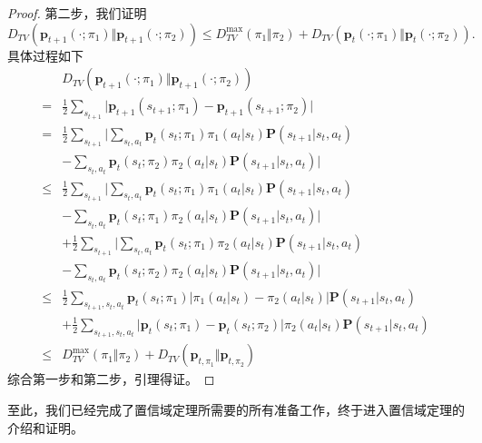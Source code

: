 \begin{proof}
    第二步，我们证明
    \begin{equation*}
        D_{TV}(\mathbf{p}_{t+1}(\cdot; \pi_1) \Vert \mathbf{p}_{t+1}(\cdot; \pi_2)) \le D^{\max}_{TV}(\pi_1 \Vert \pi_2) + D_{TV}(\mathbf{p}_{t}(\cdot; \pi_1) \Vert \mathbf{p}_{t}(\cdot; \pi_2)).
    \end{equation*}
    具体过程如下
    \begin{align*}
        &D_{TV}(\mathbf{p}_{t+1}(\cdot; \pi_1) \Vert \mathbf{p}_{t+1}(\cdot; \pi_2)) \\
        =& \frac{1}{2} \sum_{s_{t+1}} \vert \mathbf{p}_{t+1}(s_{t+1}; \pi_1) - \mathbf{p}_{t+1}(s_{t+1}; \pi_2) \vert \\
        =& \frac{1}{2} \sum_{s_{t+1}} 
        \bigg\vert \sum_{s_t, a_t} \mathbf{p}_t(s_t; \pi_1) \pi_1(a_t \vert s_t) \mathbf{P}(s_{t+1} \vert s_t, a_t) \\
        & - \sum_{s_t, a_t} \mathbf{p}_t(s_t; \pi_2) \pi_2(a_t \vert s_t) \mathbf{P}(s_{t+1} \vert s_t, a_t) \bigg\vert \\
        \le& \frac{1}{2} \sum_{s_{t+1}} 
        \bigg\vert \sum_{s_t, a_t} \mathbf{p}_t(s_t; \pi_1) \pi_1(a_t \vert s_t) \mathbf{P}(s_{t+1} \vert s_t, a_t) \\
        & - \sum_{s_t, a_t} \mathbf{p}_t(s_t; \pi_1) \pi_2(a_t \vert s_t) \mathbf{P}(s_{t+1} \vert s_t, a_t) \bigg\vert \\
        &+ \frac{1}{2} \sum_{s_{t+1}} 
        \bigg\vert \sum_{s_t, a_t} \mathbf{p}_t(s_t; \pi_1) \pi_2(a_t \vert s_t) \mathbf{P}(s_{t+1} \vert s_t, a_t) \\
        &- \sum_{s_t, a_t} \mathbf{p}_t(s_t; \pi_2) \pi_2(a_t \vert s_t) \mathbf{P}(s_{t+1} \vert s_t, a_t) \bigg\vert \\
        \le& \frac{1}{2} \sum_{s_{t+1}, s_t, a_t} \mathbf{p}_t(s_t; \pi_1)
            \vert \pi_1(a_t \vert s_t) - \pi_2(a_t \vert s_t) \vert \mathbf{P}(s_{t+1} \vert s_t, a_t)\\
        &+ \frac{1}{2} \sum_{s_{t+1}, s_t, a_t} 
            \vert \mathbf{p}_t(s_t; \pi_1) - \mathbf{p}_t(s_t; \pi_2) \vert \pi_2(a_t \vert s_t) \mathbf{P}(s_{t+1} \vert s_t, a_t) \\
        \le& D_{TV}^{\max}(\pi_1 \Vert \pi_2) + D_{TV}(\mathbf{p}_{t, \pi_1} \Vert \mathbf{p}_{t, \pi_2})
    \end{align*}
    综合第一步和第二步，引理得证。
\end{proof}

至此，我们已经完成了置信域定理所需要的所有准备工作，终于进入置信域定理的介绍和证明。

